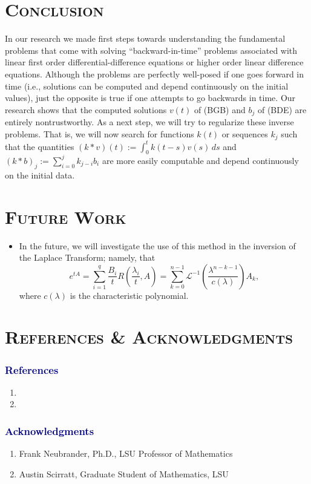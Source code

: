 \documentclass[landscape, a0]{sciposter}
\begin{document}
\begin{multicols}{4}
%
\section*{\textsc{Conclusion}}
    In our research we made first steps towards understanding the fundamental problems that come with solving ``backward-in-time'' problems associated with linear first order differential-difference equations or higher order linear difference equations. Although the problems are perfectly well-posed if one goes forward in time (i.e., solutions can be computed and depend continuously on the initial values), just the opposite is true if one attempts to go backwards in time. Our research shows that the computed solutions $v(t)$ of (BGB) and $b_j$ of (BDE) are entirely nontrustworthy. As a next step, we will try to regularize these inverse problems. That is, we will now search for functions $k(t)$ or sequences $k_j$ such that the quantities $(k*v)(t) := \int_0^t k(t-s)v(s)\, ds$ and $(k*b)_j := \sum_{i=0}^j k_{j-i}b_i$ are more easily computable and depend continuously on the initial data.

\section*{\textsc{Future Work}}
\begin{itemize}
     \item In the future, we will investigate the use of this method in the inversion of the Laplace Transform; namely, that
$$e^{tA}=\sum_{i=1}^q \frac{B_{i}}{t}R\left(\frac{\lambda_{i}}{t},A\right)=\sum_{k=0}^{n-1} \mathcal{L}^{-1}\left(\frac{\lambda^{n-k-1}}{c\left(\lambda\right)}\right)A_{k},$$
where $c\left(\lambda\right)$ is the characteristic polynomial.
\end{itemize}

\section*{\textsc{\small{References \& Acknowledgments}}}
{\small\subsubsection*{\textcolor{navy}{References}}
\begin{enumerate}
    \item 
    \item 
\end{enumerate}
\subsubsection*{\textcolor{navy}{Acknowledgments}}
\begin{enumerate}
    \item Frank Neubrander, Ph.D., LSU Professor of Mathematics 
    \item Austin Scirratt, Graduate Student of Mathematics, LSU
\end{enumerate}}
  
  \end{multicols}

\end{document}
